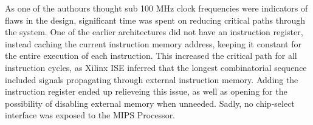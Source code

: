As one of the authours thought sub 100 MHz clock frequencies were indicators of flaws in the design, significant time was spent on reducing critical paths through the system.
One of the earlier architectures did not have an instruction register, instead caching the current instruction memory address, keeping it constant for the entire execution of each instruction.
This increased the critical path for all instruction cycles, as Xilinx ISE inferred that the longest combinatorial sequence included signals propagating through external instruction memory.
Adding the instruction register ended up relieveing this issue, as well as opening for the possibility of disabling external memory when unneeded.
Sadly, no chip-select interface was exposed to the MIPS Processor.
